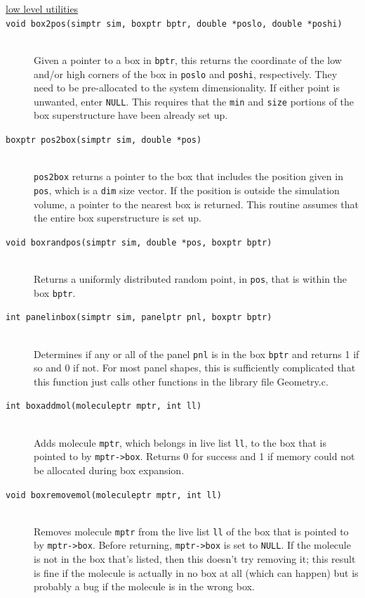 \documentclass {scrbook}
\newcommand {\ttt} {\texttt}
\begin{document}
\begin{description}

\item[\underline{low level utilities}]

\item[\ttt{void box2pos(simptr sim, boxptr bptr, double *poslo, double *poshi)}]
\hfill \\
Given a pointer to a box in \ttt{bptr}, this returns the coordinate of the low and/or high corners of the box in \ttt{poslo} and \ttt{poshi}, respectively. They need to be pre-allocated to the system dimensionality. If either point is unwanted, enter \ttt{NULL}. This requires that the \ttt{min} and \ttt{size} portions of the box superstructure have been already set up.

\item[\ttt{boxptr pos2box(simptr sim, double *pos)}]
\hfill \\
\ttt{pos2box} returns a pointer to the box that includes the position given in \ttt{pos}, which is a \ttt{dim} size vector. If the position is outside the simulation volume, a pointer to the nearest box is returned. This routine assumes that the entire box superstructure is set up.

\item[\ttt{void boxrandpos(simptr sim, double *pos, boxptr bptr)}]
\hfill \\
Returns a uniformly distributed random point, in \ttt{pos}, that is within the box \ttt{bptr}.

\item[\ttt{int panelinbox(simptr sim, panelptr pnl, boxptr bptr)}]
\hfill \\
Determines if any or all of the panel \ttt{pnl} is in the box \ttt{bptr} and returns 1 if so and 0 if not. For most panel shapes, this is sufficiently complicated that this function just calls other functions in the library file Geometry.c.

\item[\ttt{int boxaddmol(moleculeptr mptr, int ll)}]
\hfill \\
Adds molecule \ttt{mptr}, which belongs in live list \ttt{ll}, to the box that is pointed to by \ttt{mptr->box}. Returns 0 for success and 1 if memory could not be allocated during box expansion.

\item[\ttt{void boxremovemol(moleculeptr mptr, int ll)}]
\hfill \\
Removes molecule \ttt{mptr} from the live list \ttt{ll} of the box that is pointed to by \ttt{mptr->box}. Before returning, \ttt{mptr->box} is set to \ttt{NULL}. If the molecule is not in the box that's listed, then this doesn't try removing it; this result is fine if the molecule is actually in no box at all (which can happen) but is probably a bug if the molecule is in the wrong box.


\end{description}
\end{document}
